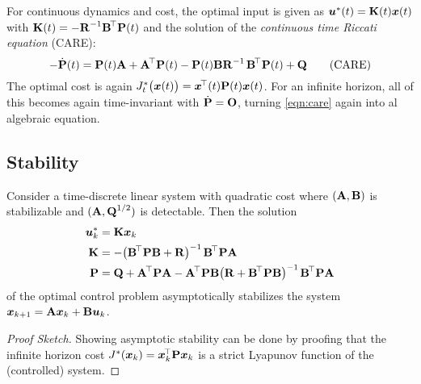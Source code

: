 			For continuous dynamics and cost, the optimal input is given as \( \bm{u}^\ast(t) = \bm{\mathrm{K}}(t) \bm{x}(t) \) with \( \bm{\mathrm{K}}(t) = -\bm{\mathrm{R}}^{-1} \bm{\mathrm{B}}^{\!\top} \bm{\mathrm{P}}(t)\) and the solution of the \emph{continuous time Riccati equation} (CARE):
			\begin{equation}
				-\dot{\bm{\mathrm{P}}}(t) = \bm{\mathrm{P}}(t) \bm{\mathrm{A}} + \bm{\mathrm{A}}^{\!\top} \bm{\mathrm{P}}(t) - \bm{\mathrm{P}}(t) \bm{\mathrm{B}} \bm{\mathrm{R}}^{-1\,} \bm{\mathrm{B}}^{\!\top} \bm{\mathrm{P}}(t) + \bm{\mathrm{Q}}  \tag{CARE}\label{eqn:care}
			\end{equation}
			The optimal cost is again \( J_t^\ast\bigl(\bm{x}(t)\bigr) = \bm{x}^{\!\top}(t) \bm{\mathrm{P}}(t) \bm{x}(t) \). For an infinite horizon, all of this becomes again time-invariant with \( \dot{\bm{\mathrm{P}}} = \bm{\mathrm{O}} \), turning \eqref{eqn:care} again into al algebraic equation.

		\subsection{Stability}
			\begin{theorem}
				Consider a time-discrete linear system with quadratic cost where \( (\bm{\mathrm{A}}, \bm{\mathrm{B}}) \) is stabilizable and \( (\bm{\mathrm{A}}, \bm{\mathrm{Q}}^{1/2}) \) is detectable. Then the solution
				\begin{align}
					\bm{u}_k^\ast & = \bm{\mathrm{K}} \bm{x}_k                                                                                                                                                                          \\
					\bm{\mathrm{K}}        & = -\bigl( \bm{\mathrm{B}}^{\!\top} \bm{\mathrm{P}} \bm{\mathrm{B}} + \bm{\mathrm{R}} \bigr)^{-1\,} \bm{\mathrm{B}}^{\!\top} \bm{\mathrm{P}} \bm{\mathrm{A}}                                                                                    \\
					\bm{\mathrm{P}}        & = \bm{\mathrm{Q}} + \bm{\mathrm{A}}^{\!\top} \bm{\mathrm{P}} \bm{\mathrm{A}} - \bm{\mathrm{A}}^{\!\top} \bm{\mathrm{P}} \bm{\mathrm{B}} \bigl( \bm{\mathrm{R}} + \bm{\mathrm{B}}^{\!\top} \bm{\mathrm{P}} \bm{\mathrm{B}} \bigr)^{-1\,} \bm{\mathrm{B}}^{\!\top} \bm{\mathrm{P}} \bm{\mathrm{A}}
				\end{align}
				of the optimal control problem asymptotically stabilizes the system \( \bm{x}_{k + 1} = \bm{\mathrm{A}} \bm{x}_k + \bm{\mathrm{B}} \bm{u}_k \).
			\end{theorem}
			\begin{proof}[Proof Sketch]
				Showing asymptotic stability can be done by proofing that the infinite horizon cost \( J^\ast(\bm{x}_k) = \bm{x}_k^{\!\top} \bm{\mathrm{P}} \bm{x}_k \) is a strict Lyapunov function of the (controlled) system.
			\end{proof}

